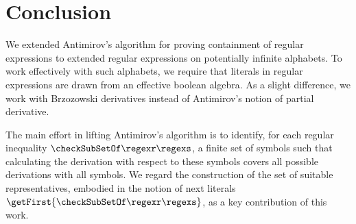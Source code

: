 \section{Conclusion}

We extended Antimirov's algorithm for proving containment of regular expressions to extended regular expressions on
potentially infinite alphabets. To work effectively with such alphabets, we require that literals in regular expressions
are drawn from an effective boolean algebra. As a slight difference, we work with Brzozowski derivatives instead of
Antimirov's notion of partial derivative.

The main effort in lifting Antimirov's algorithm is to identify, for each regular inequality
$\checkSubSetOf\regexr\regexs$, a finite set of symbols such that calculating the derivation with respect to these
symbols covers all possible derivations with all symbols. We regard the construction of the set of suitable
representatives, embodied in the notion of next literals $\getFirst{\checkSubSetOf\regexr\regexs}$, as a key
contribution of this work.
